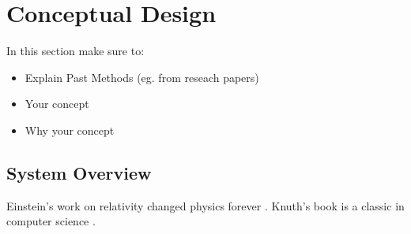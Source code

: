 \section{Conceptual Design}

In this section make sure to:
\begin{itemize}

    \item Explain Past Methods (eg. from reseach papers)

    \item Your concept

    \item Why your concept
\end{itemize}

\subsection{System Overview}


Einstein’s work on relativity changed physics forever \cite{einstein1905}.
Knuth’s book is a classic in computer science \cite{knuth1984}.
